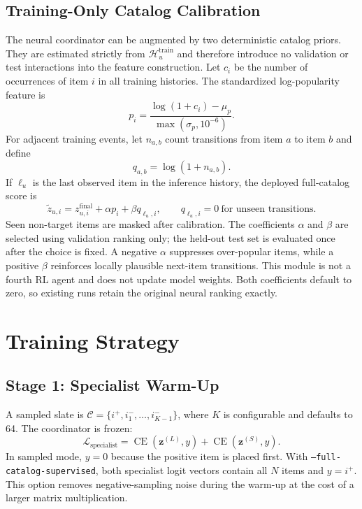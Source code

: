 \documentclass[11pt,a4paper]{article}
\begin{document}
\subsection{Training-Only Catalog Calibration}

The neural coordinator can be augmented by two deterministic catalog priors.
They are estimated strictly from $\mathcal H_u^{\mathrm{train}}$ and therefore
introduce no validation or test interactions into the feature construction.
Let $c_i$ be the number of occurrences of item $i$ in all training histories.
The standardized log-popularity feature is
\begin{equation}
  p_i=
  \frac{\log(1+c_i)-\mu_p}{\max(\sigma_p,10^{-6})}.
\end{equation}
For adjacent training events, let $n_{a,b}$ count transitions from item $a$ to
item $b$ and define
\begin{equation}
  q_{a,b}=\log(1+n_{a,b}).
\end{equation}
If $\ell_u$ is the last observed item in the inference history, the deployed
full-catalog score is
\begin{equation}
  \widetilde z_{u,i}
  =
  z_{u,i}^{\mathrm{final}}
  +\alpha p_i
  +\beta q_{\ell_u,i},
  \qquad q_{\ell_u,i}=0\ \text{for unseen transitions}.
\end{equation}
Seen non-target items are masked after calibration. The coefficients $\alpha$
and $\beta$ are selected using validation ranking only; the held-out test set
is evaluated once after the choice is fixed. A negative $\alpha$ suppresses
over-popular items, while a positive $\beta$ reinforces locally plausible
next-item transitions. This module is not a fourth RL agent and does not update
model weights. Both coefficients default to zero, so existing runs retain the
original neural ranking exactly.

\section{Training Strategy}

\subsection{Stage 1: Specialist Warm-Up}

A sampled slate is $\mathcal C=\{i^+,i_1^-,\ldots,i_{K-1}^-\}$,
where $K$ is configurable and defaults to 64. The coordinator is frozen:
\begin{equation}
  \mathcal L_{\mathrm{specialist}}
  =
  \operatorname{CE}(\bm z^{(L)},y)
  +\operatorname{CE}(\bm z^{(S)},y).
\end{equation}
In sampled mode, $y=0$ because the positive item is placed first. With
\texttt{--full-catalog-supervised}, both specialist logit vectors contain all
$N$ items and $y=i^+$. This option removes negative-sampling noise during the
warm-up at the cost of a larger matrix multiplication.
\end{document}
